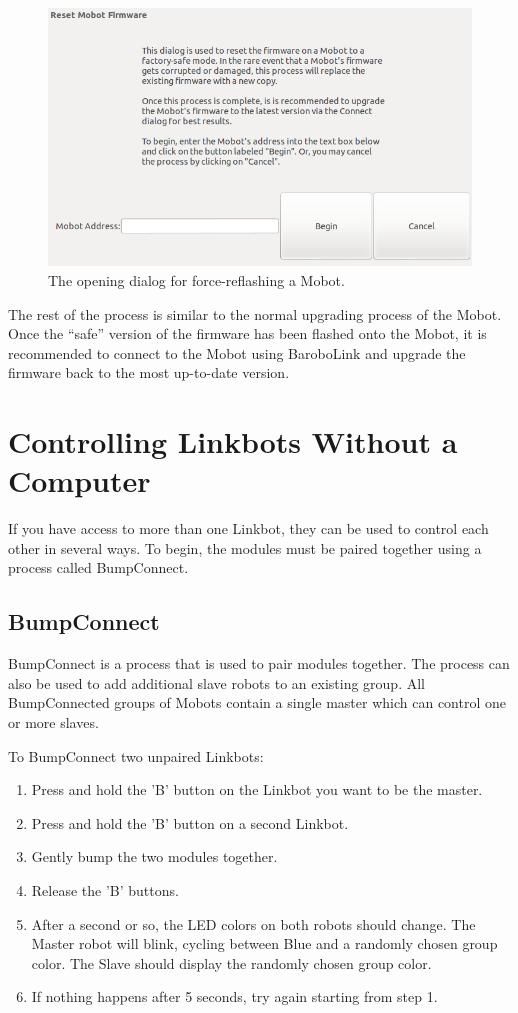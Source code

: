 \documentclass{article}
\begin{document}
\begin{figure}[H]
\begin{center}
\includegraphics[width=4.5in]{images/reset1.png}
\end{center}
\caption{\label{fig:reset1} The opening dialog for force-reflashing a Mobot.}
\end{figure}

The rest of the process is similar to the normal upgrading process of the Mobot. Once
the ``safe'' version of the firmware has been flashed onto the Mobot, it is recommended to
connect to the Mobot using BaroboLink and upgrade the firmware back to the most up-to-date
version.

\section{Controlling Linkbots Without a Computer}
If you have access to more than one Linkbot, they can be used to control each other
in several ways. To begin, the modules must be paired together using a process called
BumpConnect.

\subsection{BumpConnect}
BumpConnect is a process that is used to pair modules together. The process can also be used
to add additional slave robots to an existing group. All BumpConnected groups of Mobots
contain a single master which can control one or more slaves.

To BumpConnect two unpaired Linkbots:
\begin{enumerate}
\item Press and hold the 'B' button on the Linkbot you want to be the master.
\item Press and hold the 'B' button on a second Linkbot.
\item Gently bump the two modules together.
\item Release the 'B' buttons.
\item After a second or so, the LED colors on both robots should change. The Master 
robot will blink, cycling between Blue and a randomly chosen group color. The Slave
should display the randomly chosen group color. 
\item If nothing happens after 5 seconds, try again starting from step 1.
\end{enumerate}
\end{document}
